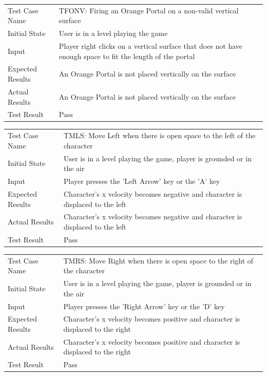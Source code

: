 \documentclass[12pt, titlepage]{article}
\begin{document}
\begin{center}
\begin{tabular}{ | l | p{10cm} | }
\hline
Test Case Name & TFONV: Firing an Orange Portal on a non-valid vertical surface	\\
Initial State & User is in a level playing the game	\\
Input & Player right clicks on a vertical surface that does not have enough space to fit the length of the portal	\\
Expected Results & An Orange Portal is not placed vertically on the surface	\\
Actual Results & An Orange Portal is not placed vertically on the surface	\\
Test Result & Pass	\\
\hline
\end{tabular}
\end{center}

\begin{center}
\begin{tabular}{ | l | p{10cm} | }
\hline
Test Case Name & TMLS: Move Left when there is open space to the left of the character	\\
Initial State & User is in a level playing the game, player is grounded or in the air	\\
Input & Player presses the 'Left Arrow' key or the 'A' key	\\
Expected Results & Character's x velocity becomes negative and character is displaced to the left	\\
Actual Results & Character's x velocity becomes negative and character is displaced to the left	\\
Test Result & Pass	\\
\hline
\end{tabular}
\end{center}

\begin{center}
\begin{tabular}{ | l | p{10cm} | }
\hline
Test Case Name & TMRS: Move Right when there is open space to the right of the character	\\
Initial State & User is in a level playing the game, player is grounded or in the air	\\
Input & Player presses the 'Right Arrow' key or the 'D' key	\\
Expected Results & Character's x velocity becomes positive and character is displaced to the right	\\
Actual Results & Character's x velocity becomes positive and character is displaced to the right	\\
Test Result & Pass	\\
\hline
\end{tabular}
\end{center}
\end{document}
